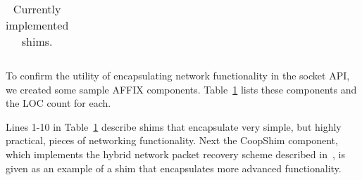 \begin{table}[t]
\begin{tabular*}{\columnwidth}{|c|l|p{3.05cm}|l|}
\end{tabular*}
\caption{Currently implemented shims.}
\label{tab-implementedshims} 
\end{table}

To confirm the utility of encapsulating network functionality in the socket API, 
we created some sample AFFIX components.  Table~\ref{tab-implementedshims} 
lists these components and the LOC count for each.   

Lines 1-10 in Table~\ref{tab-implementedshims} describe shims 
that encapsulate very simple, but highly practical, pieces of networking functionality.
Next the CoopShim component, which implements the hybrid network packet recovery 
scheme described in~\cite{sinkar2008cooperative}, is given as an example of a 
shim that encapsulates more advanced functionality.

